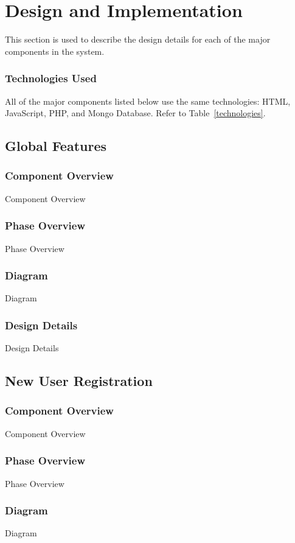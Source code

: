 
\chapter{Design  and Implementation}
This section is used to describe the design details for each of the major components 
in the system.    

\subsection{Technologies  Used}
All of the major components listed below use the same technologies: HTML, JavaScript, PHP, and Mongo Database. Refer to Table~\ref{technologies}.

\section{Global Features }

\subsection{Component  Overview}
Component Overview
\subsection{Phase Overview}
Phase Overview
\subsection{Diagram}
Diagram
\subsection{Design Details}
Design Details

\section{New User Registration }

\subsection{Component  Overview}
Component Overview
\subsection{Phase Overview}
Phase Overview
\subsection{Diagram}
Diagram
